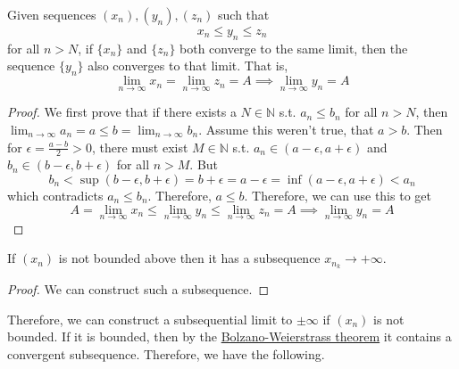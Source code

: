   \begin{theorem}
    \label{thm:squeeze-theorem-for-sequences}
    Given sequences $(x_n), (y_n), (z_n)$ such that 
    \begin{equation}
      x_n \leq y_n \leq z_n
    \end{equation}
    for all $n > N$, if $\{x_n\}$ and $\{z_n\}$ both converge to the same limit, then the sequence $\{y_n\}$ also converges to that limit. That is, 
    \begin{equation}
      \lim_{n \rightarrow \infty} x_n = \lim_{n \rightarrow \infty} z_n = A \implies \lim_{n \rightarrow \infty} y_n = A
    \end{equation}
  \end{theorem} 
  \begin{proof}
    We first prove that if there exists a $N \in \mathbb{N}$ s.t. $a_n \leq b_n$ for all $n > N$, then $\lim_{n \rightarrow \infty} a_n = a \leq b = \lim_{n \rightarrow \infty} b_n$. Assume this weren't true, that $a > b$. Then for $\epsilon = \frac{a - b}{2} > 0$, there must exist $M \in \mathbb{N}$ s.t. $a_n \in (a - \epsilon, a + \epsilon)$ and $b_n \in (b - \epsilon, b + \epsilon)$ for all $n > M$. But 
    \begin{equation}
      b_n < \sup (b - \epsilon, b + \epsilon) = b + \epsilon = a - \epsilon = \inf (a - \epsilon, a + \epsilon) < a_n
    \end{equation}
    which contradicts $a_n \leq b_n$. Therefore, $a \leq b$. Therefore, we can use this to get 
    \begin{equation}
      A = \lim_{n \rightarrow \infty} x_n \leq \lim_{n \rightarrow \infty} y_n \leq \lim_{n \rightarrow \infty} z_n = A \implies \lim_{n \rightarrow \infty} y_n = A
    \end{equation}
  \end{proof}

  \begin{theorem}
    \label{thm:unbounded-sequence-has-subsequence-tending-to}
    If $(x_n)$ is not bounded above then it has a subsequence $x_{n_k} \rightarrow +\infty$. 
  \end{theorem}
  \begin{proof}
    We can construct such a subsequence. 
  \end{proof}

  Therefore, we can construct a subsequential limit to $\pm \infty$ if $(x_n)$ is not bounded. If it is bounded, then by the \hyperref[thm:bolzano-weierstrass-theorem]{Bolzano-Weierstrass theorem} it contains a convergent subsequence. Therefore, we have the following. 

